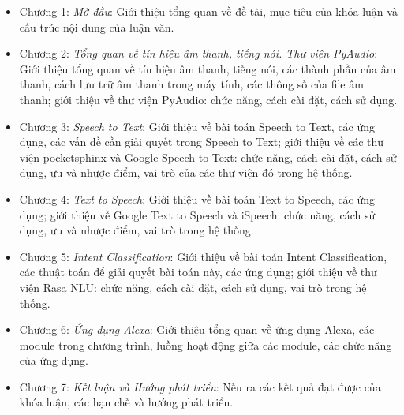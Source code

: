 \begin{itemize}
    \item Chương 1: \emph{Mở đầu}: Giới thiệu tổng quan về đề tài, mục tiêu của khóa luận và cấu trúc nội dung của luận văn.
    \item Chương 2: \emph{Tổng quan về tín hiệu âm thanh, tiếng nói. Thư viện PyAudio}: Giới thiệu tổng quan về tín hiệu âm thanh, tiếng nói, các thành phần của âm thanh, cách lưu trữ âm thanh trong máy tính, các thông số của file âm thanh; giới thiệu về thư viện PyAudio: chức năng, cách cài đặt, cách sử dụng.
    \item Chương 3: \emph{Speech to Text}: Giới thiệu về bài toán Speech to Text, các ứng dụng, các vấn đề cần giải quyết trong Speech to Text; giới thiệu về các thư viện pocketsphinx và Google Speech to Text: chức năng, cách cài đặt, cách sử dụng, ưu và nhược điểm, vai trò của các thư viện đó trong hệ thống.
    \item Chương 4: \emph{Text to Speech}: Giới thiệu về bài toán Text to Speech, các ứng dụng; giới thiệu về Google Text to Speech và iSpeech: chức năng, cách sử dụng, ưu và nhược điểm, vai trò trong hệ thống.
    \item Chương 5: \emph{Intent Classification}: Giới thiệu về bài toán Intent Classification, các thuật toán để giải quyết bài toán này, các ứng dụng; giới thiệu về thư viện Rasa NLU: chức năng, cách cài đặt, cách sử dụng, vai trò trong hệ thống.
    \item Chương 6: \emph{Ứng dụng Alexa}: Giới thiệu tổng quan về ứng dụng Alexa, các module trong chương trình, luồng hoạt động giữa các module, các chức năng của ứng dụng.
    \item Chương 7: \emph{Kết luận và Hướng phát triển}: Nếu ra các kết quả đạt được của khóa luận, các hạn chế và hướng phát triển.
\end{itemize}

